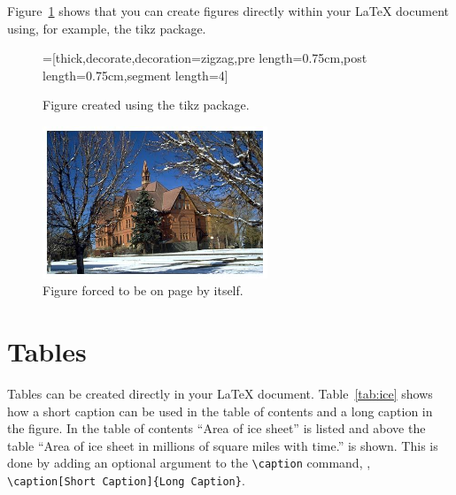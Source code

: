 Figure~\ref{fig:tikz} shows that you can create figures directly within your \LaTeX{} document using, for example, the tikz package.
\begin{figure}[htbp]
  \centering
  =[thick,decorate,decoration={zigzag,pre length=0.75cm,post length=0.75cm,segment length=4}]
  \caption{Figure created using the tikz package.}
  \label{fig:tikz}
\end{figure}

\begin{figure}[P!]
  \centering
  \includegraphics[width=0.6\textwidth]{figs/MSU.jpg}
  \caption{Figure forced to be on page by itself.}
  \label{fig:page}
\end{figure}

\clearpage

\section{Tables}\label{Sect:tabs}
Tables can be created directly in your \LaTeX{} document.  Table~\ref{tab:ice} shows how a short caption can be used in the table of contents and a long caption in the figure.  In the table of contents ``Area of ice sheet'' is listed and above the table ``Area of ice sheet in millions of square miles with time.'' is shown.  This is done by adding an optional argument to the \verb|\caption| command, \ie, \verb|\caption[Short Caption]{Long Caption}|.

